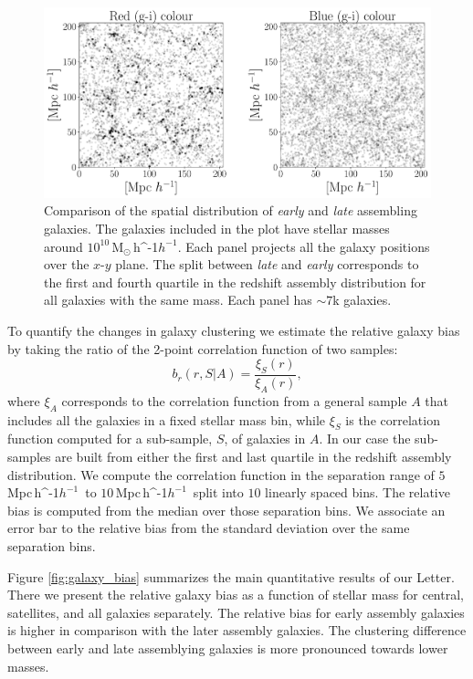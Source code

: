\documentclass[fleqn,usenatbib]{mnras}
\newcommand{\Msunh}{\,{\rm M}$_{\odot}$\,\ifmmode h^{-1}\else $h^{-1}$\fi}
\newcommand{\Mpch}{\,{\rm Mpc}\,\ifmmode h^{-1}\else $h^{-1}$\fi}
\begin{document}
\begin{figure}
    \centering
    \includegraphics[width=1.8\columnwidth]{figuras/scatter_color.pdf}
    \caption{Comparison of the spatial distribution of \emph{early}
      and \emph{late} assembling galaxies. 
    The galaxies included in the plot have stellar masses around
    $10^{10}$\Msunh.  
    Each panel projects all the galaxy positions over the $x$-$y$
    plane.  
    The split between \emph{late} and \emph{early} corresponds to the
    first and fourth quartile in the redshift assembly distribution
    for all galaxies with the same mass. 
    Each panel has $\sim7$k galaxies. }
    \label{fig:comparison}
\end{figure}




To quantify the changes in galaxy clustering we estimate the relative
galaxy bias by taking the ratio of the 2-point correlation function of two
samples: 
%
\begin{equation}
b_r(r, S|A)= \frac{\xi_S(r)}{\xi_A(r)}, 
\label{eq:relative}
\end{equation}
%
where $\xi_A$ corresponds to the correlation function from a general
sample $A$ that includes all the galaxies in a fixed stellar mass bin,
while $\xi_S$ is the correlation function computed for a sub-sample,
$S$, of galaxies in $A$. 
In our case the sub-samples are built from either the first and last
quartile in the redshift assembly distribution. 
We compute the correlation function in the separation range of
$5$\Mpch\ to $10$\Mpch\ split into $10$ linearly spaced bins. 
The relative bias is computed from the median over those separation bins.
We associate an error bar to the relative bias from the standard
deviation over the same separation bins.


Figure \ref{fig:galaxy_bias} summarizes the main quantitative results
of our Letter.
There we present the relative galaxy bias as a
function of stellar mass for central, satellites, and all galaxies
separately. 
The relative bias for early assembly galaxies is higher in comparison
with the later assembly galaxies.
The clustering difference between early and late assemblying galaxies
is more pronounced towards lower masses.
\end{document}
